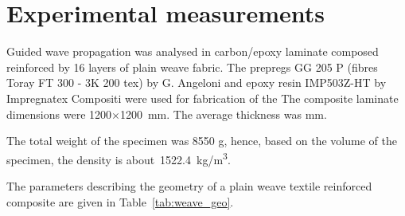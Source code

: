 \section{Experimental measurements \label{sec:experiment}}


Guided wave propagation was analysed in carbon/epoxy laminate composed reinforced 
by 16 layers of plain weave fabric. The prepregs GG 205  P (fibres Toray FT 300 - 3K 
200 tex) by G. Angeloni and epoxy resin IMP503Z-HT by Impregnatex Compositi were 
used for fabrication of the   The composite laminate 
dimensions were 1200\(\times\)1200~mm. The average thickness was   
mm. 

The total weight of the specimen was 8550 g, hence, based on the volume of the specimen, the density is about~1522.4~kg/m\textsuperscript{3}.

The parameters describing the geometry of a plain weave textile reinforced composite are given in Table~\ref{tab:weave_geo}. 
 
\begin{table}[h]
\caption{GA optimisation results based on statistics (mean \(\mu\) and standard 
	deviation \(\sigma\)) of   GA runs; Units of  elastic constants: [GPa].}
\end{table}




